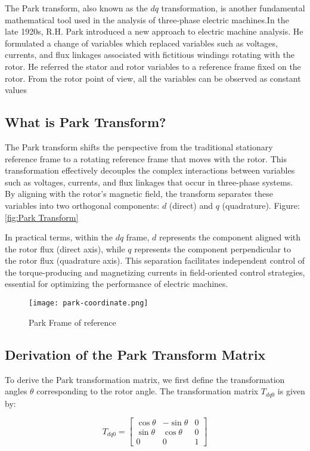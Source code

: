 The Park transform, also known as the \( dq \) transformation, is another
fundamental mathematical tool used in the analysis of three-phase electric
machines.In the late 1920s, R.H. Park\cite{R. H. Park} introduced a new
approach to electric machine analysis. He formulated a change of variables
which replaced variables such as voltages, currents, and flux linkages
associated with fictitious windings rotating with the rotor. He referred the
stator and rotor variables to a reference frame fixed on the rotor. From the
rotor point of view, all the variables can be observed as constant values
\subsection{What is Park Transform?}

The Park transform shifts the perspective from the traditional stationary
reference frame to a rotating reference frame that moves with the rotor. This
transformation effectively decouples the complex interactions between variables
such as voltages, currents, and flux linkages that occur in three-phase
systems. By aligning with the rotor's magnetic field, the transform separates
these variables into two orthogonal components: \( d \) (direct) and \( q \)
(quadrature). Figure:\ref{fig:Park Transform}

In practical terms, within the \( dq \) frame, \( d \) represents the component
aligned with the rotor flux (direct axis), while \( q \) represents the
component perpendicular to the rotor flux (quadrature axis). This separation
facilitates independent control of the torque-producing and magnetizing
currents in field-oriented control strategies, essential for optimizing the
performance of electric machines.
\begin{figure}[h]
    \centering
    \texttt{[image: park-coordinate.png]}
    \caption{Park Frame of reference}
    \label{fig:Park Frame of reference}
\end{figure}
\subsection{Derivation of the Park Transform Matrix}

To derive the Park transformation matrix, we first define the transformation
angles \( \theta \) corresponding to the rotor angle. The transformation matrix
\( T_{dq0} \) is given by:

\begin{equation*}
    T_{dq0} =
    \begin{bmatrix}
        \cos \theta & -\sin \theta & 0 \\
        \sin \theta & \cos \theta  & 0 \\
        0           & 0            & 1
    \end{bmatrix}
\end{equation*}

